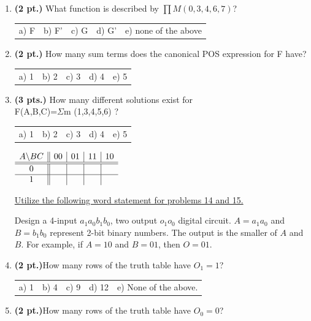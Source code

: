 \documentclass{article}
\begin{document}
\begin{enumerate}
\item {\bf (2 pt.)} What function is described by $\prod M(0,3,4,6,7)$?

\begin{tabular}{p{0.7in} p{0.7in} p{0.7in} p{0.7in} l}
a) F & b) F' & c) G & d) G' & e) none of the above
\end{tabular}

\item {\bf (2 pt.)} How many sum terms does the canonical POS expression 
for F have?

\begin{tabular}{p{0.7in} p{0.7in} p{0.7in} p{0.7in} l}
a) 1 & b) 2 & c) 3 & d) 4 & e) 5
\end{tabular}

\item {\bf (3 pts.)} How many different \SOPmin solutions exist for \\
F(A,B,C)=$\Sigma$m (1,3,4,5,6) ?

\begin{tabular}{p{0.7in} p{0.7in} p{0.7in} p{0.7in} l}
a) 1 & b) 2 & c) 3 & d) 4 & e) 5
\end{tabular}

$ \begin{array} {c||c|c|c|c}
        A \backslash BC & 00 & 01 & 11 & 10 \\ \hline \hline
        0        &    &    &    &    \\ \hline
        1        &    &    &    &    \\ 
\end{array} $


\pagebreak

\underline{Utilize the following word statement for problems 14 and 15.}


Design a 4-input $a_1a_0b_1b_0$, two output $o_1 o_0$ digital circuit.  
$A=a_1a_0$ and $B=b_1b_0$ represent 2-bit binary numbers.  The output 
is the smaller of $A$ and $B$.  For example, if $A=10$ and $B=01$, then $O=01$.

\item {\bf (2 pt.)}How many rows of the truth table have $O_1 = 1$?

\begin{tabular}{p{0.7in} p{0.7in} p{0.7in} p{0.7in} l}
a) 1 & b) 4 & c) 9 & d) 12 & e) None of the above.
\end{tabular}

\item {\bf (2 pt.)}How many rows of the truth table have $O_0 = 0$?


\end{enumerate}
\end{document}
